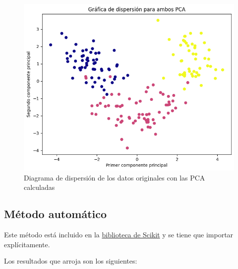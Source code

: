 \begin{center}
    \begin{figure}[!ht]
        \centering
        \includegraphics[scale=0.67]{Manual_PCA_Scatter.png}
        \caption{Diagrama de dispersión de los datos originales con las PCA calculadas}
    \end{figure}
\end{center}
\vskip 10cm

\subsection[Automatico]{Método automático}
Este método está incluido en la \href{https://scikit-learn.org/stable/modules/generated/sklearn.decomposition.PCA.html}{biblioteca de Scikit} y se tiene que importar explícitamente.

Los resultados que arroja son los siguientes:
